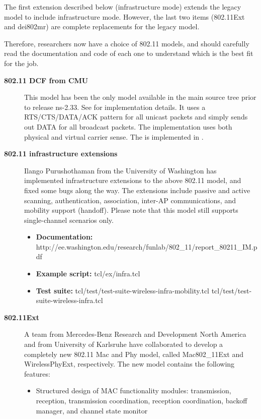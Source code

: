 The first extension described below (infrastructure mode) extends
the legacy model to include infrastructure mode.  However, the last
two items (802.11Ext and dei802mr) are complete replacements for the
legacy model.

Therefore, researchers now have a choice of 802.11 models, and
should carefully read the documentation and code of each one to
understand which is the best fit for the job. 

\begin{description}
\item[{\bf 802.11 DCF from CMU}] 
  This model has been the only model available in the main \ns source
  tree prior to release ns-2.33.  See  for 
  implementation details.  It uses a 
  RTS/CTS/DATA/ACK pattern for all unicast packets and simply sends out
  DATA for all broadcast packets. The implementation uses both 
  physical and virtual carrier sense. The
   is implemented in
  .
\item[{\bf 802.11 infrastructure extensions}] 
  Ilango Purushothaman from the University of Washington has implemented
  infrastructure extensions to the above 802.11 model, and fixed some bugs
  along the way.  The extensions include passive and active scanning,
  authentication, association, inter-AP communications, and mobility
  support (handoff).  Please note that this model still supports
  single-channel scenarios only. 
\begin{itemize}
\item {\bf Documentation:} http://ee.washington.edu/research/funlab/802\_11/report\_80211\_IM.pdf
\item {\bf Example script:} tcl/ex/infra.tcl 
\item {\bf Test suite:} tcl/test/test-suite-wireless-infra-mobility.tcl tcl/test/test-suite-wireless-infra.tcl
\end{itemize}
\item[{\bf 802.11Ext}]  
  A team from Mercedes-Benz Research and Development North America and
  from University of Karlsruhe have collaborated to develop a completely
  new 802.11 Mac and Phy model, called Mac802\_11Ext and WirelessPhyExt,
  respectively.  The new model contains the following features:
\begin{itemize}
\item Structured design of MAC functionality modules:  transmission, 
reception, transmission coordination, reception coordination, backoff
manager, and channel state monitor

\end{itemize}
\end{description}
